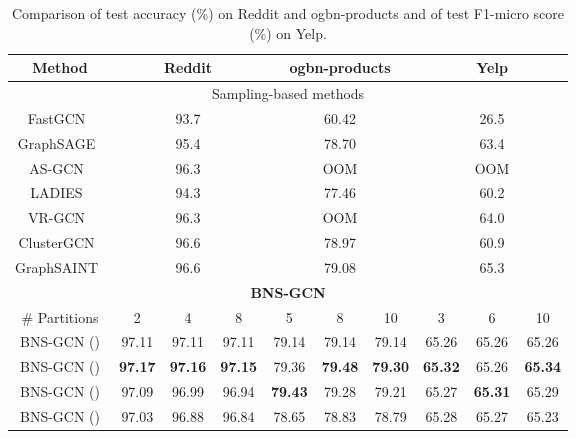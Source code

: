 \documentclass{article}
\begin{document}
\begin{table*}[t]
\centering
\caption{Comparison of test accuracy (\%) on Reddit and ogbn-products and of test F1-micro score (\%) on Yelp.}
\begin{tabular}{c|ccccccccc} 
\hline
Method  & \multicolumn{3}{c|}{Reddit} & \multicolumn{3}{c|}{ogbn-products}& \multicolumn{3}{c}{Yelp} \\ \hline
\multicolumn{10}{c}{{Sampling-based methods}} \\ \hline
FastGCN~\citep{chen2018fastgcn} & \multicolumn{3}{c|}{93.7} & \multicolumn{3}{c|}{60.42} & \multicolumn{3}{c}{26.5} \\
GraphSAGE~\citep{hamilton2017inductive} & \multicolumn{3}{c|}{95.4} & \multicolumn{3}{c|}{78.70} & \multicolumn{3}{c}{63.4} \\
\multicolumn{1}{c|}{AS-GCN~\citep{huang2018adaptive}} & \multicolumn{3}{c|}{96.3} & \multicolumn{3}{c|}{OOM} & \multicolumn{3}{c}{OOM} \\
\multicolumn{1}{c|}{LADIES~\citep{zou2019layer}} & \multicolumn{3}{c|}{94.3} & \multicolumn{3}{c|}{77.46} & \multicolumn{3}{c}{60.2} \\
\multicolumn{1}{c|}{VR-GCN~\citep{chen2018stochastic}} & \multicolumn{3}{c|}{96.3} & \multicolumn{3}{c|}{OOM} & \multicolumn{3}{c}{64.0} \\
\multicolumn{1}{c|}{ClusterGCN~\citep{chiang2019cluster}} & \multicolumn{3}{c|}{96.6} & \multicolumn{3}{c|}{78.97} & \multicolumn{3}{c}{60.9} \\
\multicolumn{1}{c|}{GraphSAINT~\citep{zeng2019graphsaint}} & \multicolumn{3}{c|}{96.6} & \multicolumn{3}{c|}{79.08} & \multicolumn{3}{c}{65.3} \\ \hline
\multicolumn{10}{c}{\textbf{BNS-GCN}} \\ \hline
\multicolumn{1}{c|}{\# Partitions} & 2 & 4 & \multicolumn{1}{c|}{8} & 5 & 8 & \multicolumn{1}{c|}{10} & 3 & 6 & 10 \\ \hline
\multicolumn{1}{c|}{BNS-GCN ()} & 97.11 & 97.11 & \multicolumn{1}{c|}{97.11} & 79.14 & 79.14 & \multicolumn{1}{c|}{79.14} & 65.26 & 65.26 & \multicolumn{1}{c}{65.26} \\
\multicolumn{1}{c|}{BNS-GCN ()} & \textbf{97.17} & \textbf{97.16} & \multicolumn{1}{c|}{\textbf{97.15}} & 79.36 & \textbf{79.48} & \multicolumn{1}{c|}{\textbf{79.30}} & \textbf{65.32} & 65.26 & \textbf{65.34}\\
\multicolumn{1}{c|}{BNS-GCN ()} & 97.09 & 96.99 & \multicolumn{1}{c|}{96.94} & \textbf{79.43} & 79.28 & \multicolumn{1}{c|}{79.21} & 65.27 & \textbf{65.31} & 65.29 \\
\multicolumn{1}{c|}{BNS-GCN ()} & 97.03 & 96.88 & \multicolumn{1}{c|}{96.84} & 78.65 & 78.83 & \multicolumn{1}{c|}{78.79} & 65.28 & 65.27 & 65.23\\
\hline
\end{tabular}
\label{tab:acc}
\end{table*}
\end{document}
